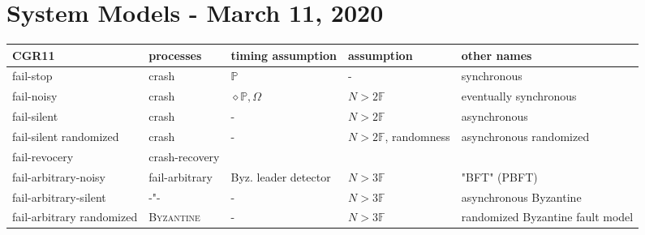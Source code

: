 \documentclass{article}
\begin{document}
	\section{System Models - March 11, 2020}
	\begin{adjustwidth}{-5em}{2em}
		\begin{tabular}{|l|l|l|l|l|}
			\hline
			\cellcolor{gray!80} CGR11 & \cellcolor{gray!80} processes & \cellcolor{gray!80} timing assumption & \cellcolor{gray!80} assumption & \cellcolor{gray!80} other names \\
			\hline
			fail-stop & crash & $\mathbb{P}$ & - & synchronous \\
			fail-noisy & crash & $\diamond \mathbb{P}, \Omega$ & $N > 2 \mathbb{F}$ & eventually synchronous \\
			fail-silent & crash & - & $N > 2 \mathbb{F}$ & asynchronous \\
			fail-silent randomized & crash & - & $N > 2 \mathbb{F}$, randomness & asynchronous randomized \\
			fail-revocery & crash-recovery & & & \\
			fail-arbitrary-noisy & fail-arbitrary & Byz. leader detector & $N > 3 \mathbb{F}$ & "BFT" (PBFT) \\
			fail-arbitrary-silent & -"- & - & $N > 3 \mathbb{F}$ & asynchronous Byzantine \\
			fail-arbitrary randomized & \textsc{Byzantine} & - & $N > 3 \mathbb{F}$ & randomized Byzantine fault model \\
			\hline
		\end{tabular}
	\end{adjustwidth}
\end{document}
